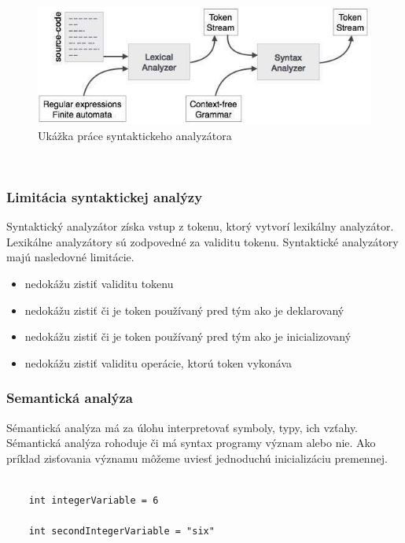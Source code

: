  \newline
  \newline
\begin{figure}[!htbp]
	\centering
	\includegraphics[width=15cm]{img/syntax_analyzer.jpg}
	\caption{Ukážka práce syntaktickeho  analyzátora}
	\label{fig:test}
\end{figure}
 \newline
 \newpage
\subsubsection{Limitácia syntaktickej analýzy}
\indent Syntaktický analyzátor získa vstup z tokenu, ktorý vytvorí lexikálny analyzátor. Lexikálne analyzátory sú zodpovedné za validitu tokenu. Syntaktické analyzátory majú nasledovné limitácie.

\begin{itemize}
	\item nedokážu zistiť validitu tokenu
	\item nedokážu zistiť či je token používaný pred tým ako je deklarovaný
	\item nedokážu zistiť či je token používaný pred tým ako je inicializovaný
	\item nedokážu zistiť validitu operácie, ktorú token vykonáva
\end{itemize}



\subsubsection{Semantická  analýza}
\indent Sémantická analýza má za úlohu interpretovať symboly, typy, ich vzťahy. Sémantická analýza rohoduje či má syntax programy význam alebo nie.
Ako príklad zisťovania významu môžeme uviesť jednoduchú inicializáciu premennej.\cite{gram}

\begin{lstlisting}

	int integerVariable = 6

	int secondIntegerVariable = "six"
\end{lstlisting}

